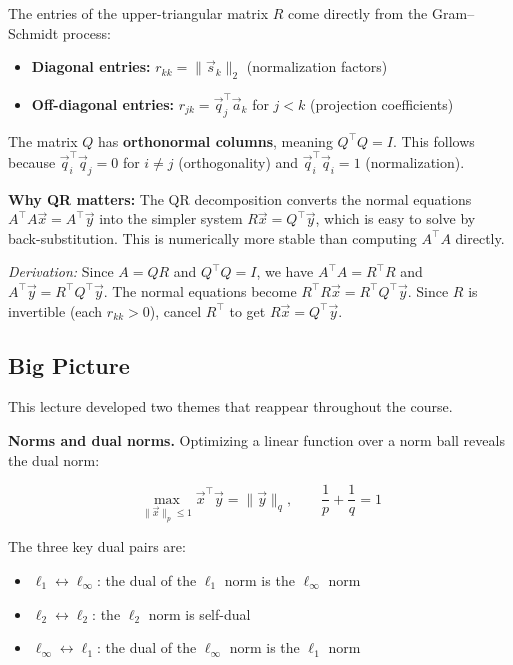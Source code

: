 \documentclass[10pt, twocolumn]{article}
\theoremstyle{definition}
\theoremstyle{plain}
\begin{document}
The entries of the upper-triangular matrix $R$ come directly from the Gram--Schmidt process:
\begin{itemize}
    \item \textbf{Diagonal entries:} $r_{kk} = \|\vec{s}_k\|_2$ \quad (normalization factors)
    \item \textbf{Off-diagonal entries:} $r_{jk} = \vec{q}_j^\top \vec{a}_k$ for $j < k$ \quad (projection coefficients)
\end{itemize}

The matrix $Q$ has \textbf{orthonormal columns}, meaning $Q^\top Q = I$. This follows because $\vec{q}_i^\top \vec{q}_j = 0$ for $i \ne j$ (orthogonality) and $\vec{q}_i^\top \vec{q}_i = 1$ (normalization).

\begin{tcolorbox}[colframe=black!50]
\textbf{Why QR matters:} The QR decomposition converts the normal equations $A^\top A \vec{x} = A^\top \vec{y}$ into the simpler system $R\vec{x} = Q^\top \vec{y}$, which is easy to solve by back-substitution. This is numerically more stable than computing $A^\top A$ directly.

\medskip

\textit{Derivation:} Since $A = QR$ and $Q^\top Q = I$, we have $A^\top A = R^\top R$ and $A^\top \vec{y} = R^\top Q^\top \vec{y}$. The normal equations become $R^\top R \vec{x} = R^\top Q^\top \vec{y}$. Since $R$ is invertible (each $r_{kk} > 0$), cancel $R^\top$ to get $R\vec{x} = Q^\top \vec{y}$.
\end{tcolorbox}

\subsection{Big Picture}

This lecture developed two themes that reappear throughout the course.

\textbf{Norms and dual norms.} Optimizing a linear function over a norm ball reveals the dual norm:
\begin{result}
\[
    \max_{\|\vec{x}\|_p \le 1} \vec{x}^\top \vec{y} = \|\vec{y}\|_q, \qquad \frac{1}{p} + \frac{1}{q} = 1
\]
\end{result}

The three key dual pairs are:
\begin{itemize}
    \item $\ell_1 \leftrightarrow \ell_\infty$: the dual of the $\ell_1$ norm is the $\ell_\infty$ norm
    \item $\ell_2 \leftrightarrow \ell_2$: the $\ell_2$ norm is self-dual
    \item $\ell_\infty \leftrightarrow \ell_1$: the dual of the $\ell_\infty$ norm is the $\ell_1$ norm
\end{itemize}
\end{document}
